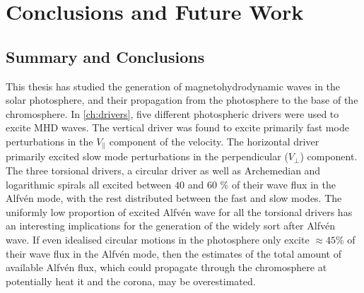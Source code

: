 
\chapter{Conclusions and Future Work}\label{ch:conclusions}

\section{Summary and Conclusions}

This thesis has studied the generation of magnetohydrodynamic waves in the solar photosphere, and their propagation from the photosphere to the base of the chromosphere.
In \cref{ch:drivers}, five different photospheric drivers were used to excite MHD waves.
The vertical driver was found to excite primarily fast mode perturbations in the $V_\parallel$ component of the velocity.
The horizontal driver primarily excited slow mode perturbations in the perpendicular ($V_\perp$) component.
The three torsional drivers, a circular driver as well as Archemedian and logarithmic spirals all excited between $40$ and $60$ \% of their wave flux in the Alfv\'en mode, with the rest distributed between the fast and slow modes.
The uniformly low proportion of excited Alfv\'en wave for all the torsional drivers has an interesting implications for the generation of the widely sort after Alfv\'en wave.
If even idealised circular motions in the photosphere only excite $\approx 45$\% of their wave flux in the Alfv\'en mode, then the estimates of the total amount of available Alfv\'en flux, which could propagate through the chromosphere at potentially heat it and the corona, may be overestimated.

